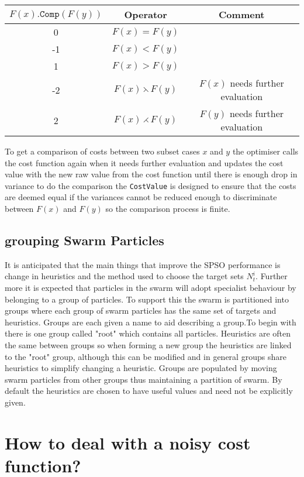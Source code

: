 \documentclass[a4paper,oneside,english]{book}
\numberwithin{equation}{section}
\numberwithin{figure}{section}
\begin{document}
\begin{tabular}{|c|c|c|}\hline
$F(x).\mathtt{Comp}(F(y))$ & Operator& Comment\\
\hline \hline 
0& $F(x)=F(y)$& \\
-1& $F(x)<F(y)$ &\\
1&$F(x)>F(y)$ &\\
-2&$F(x)\leftthreetimes F(y)$& $F(x)$ needs further evaluation\\
2&$F(x)\rightthreetimes F(y)$& $F(y)$ needs further evaluation\\
\hline	
	
\end{tabular}\newline
To get a comparison of costs between two subset cases $x$ and $y$  the optimiser  calls the cost function again when it needs  further evaluation and updates the cost  value with the new raw  value  from the cost function until there is enough drop in variance to do the comparison the \texttt{CostValue} is designed to ensure  that the costs are deemed equal if the variances cannot be reduced enough to discriminate between $F(x)$ and $F(y)$ so the comparison process is finite.



\subsection{grouping Swarm Particles } 
It is anticipated  that the main things that improve the SPSO performance is change in heuristics and the method used to choose the target sets $N_t^i$. Further more it is expected that particles in the swarm will adopt specialist behaviour by belonging to a group of particles. To support this the swarm is  partitioned into groups where each group of swarm particles has the same set of targets and heuristics. Groups are each given a name to aid describing a group.To begin with there is one group called "root" which contains all particles. Heuristics are often the same between groups so when forming a new group the heuristics are linked to the "root" group, although this can be modified and in general groups share heuristics to simplify changing a heuristic. Groups are populated by moving swarm particles from other groups thus maintaining a partition of swarm. By default the heuristics are chosen to have useful values and need not be explicitly given.              
  	
\section{How to deal with a noisy cost function?}
\end{document}
